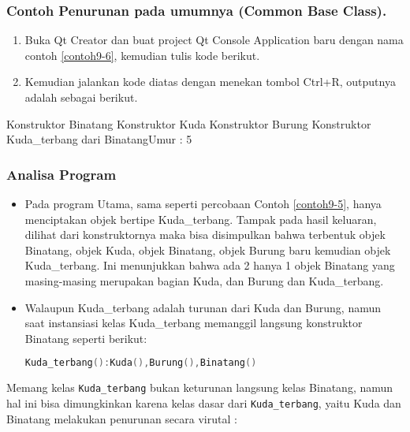 \subsubsection*{Contoh  Penurunan pada umumnya (Common Base Class).}

\begin{enumerate}

\item
  Buka Qt Creator dan buat project Qt Console Application baru dengan
  nama contoh \ref{contoh9-6}, kemudian tulis kode berikut.




\item
  Kemudian jalankan kode diatas dengan menekan tombol Ctrl+R, outputnya
  adalah sebagai berikut.
\end{enumerate}
\begin{lcverbatim}
Konstruktor Binatang
Konstruktor Kuda 
Konstruktor Burung
Konstruktor Kuda_terbang dari
BinatangUmur : 5
\end{lcverbatim}


\subsubsection*{Analisa Program}

\begin{itemize}
\item
  Pada program Utama, sama seperti percobaan Contoh \ref{contoh9-5}, hanya menciptakan
  objek bertipe Kuda\_terbang. Tampak pada hasil keluaran, dilihat dari
  konstruktornya maka bisa disimpulkan bahwa terbentuk objek Binatang,
  objek Kuda, objek Binatang, objek Burung baru kemudian objek
  Kuda\_terbang. Ini menunjukkan bahwa ada 2 hanya 1 objek Binatang yang
  masing-masing merupakan bagian Kuda, dan Burung dan Kuda\_terbang.
\item
  Walaupun Kuda\_terbang adalah turunan dari Kuda dan Burung, namun saat
  instansiasi kelas Kuda\_terbang memanggil langsung konstruktor
  Binatang seperti berikut:

\begin{lstlisting}[language=c++, numbers=none]
Kuda_terbang():Kuda(),Burung(),Binatang()
\end{lstlisting}
\end{itemize}

Memang kelas \texttt{Kuda\_terbang} bukan keturunan langsung kelas
Binatang, namun hal ini bisa dimungkinkan karena kelas dasar dari
\texttt{Kuda\_terbang}, yaitu Kuda dan Binatang melakukan penurunan
secara virutal :


